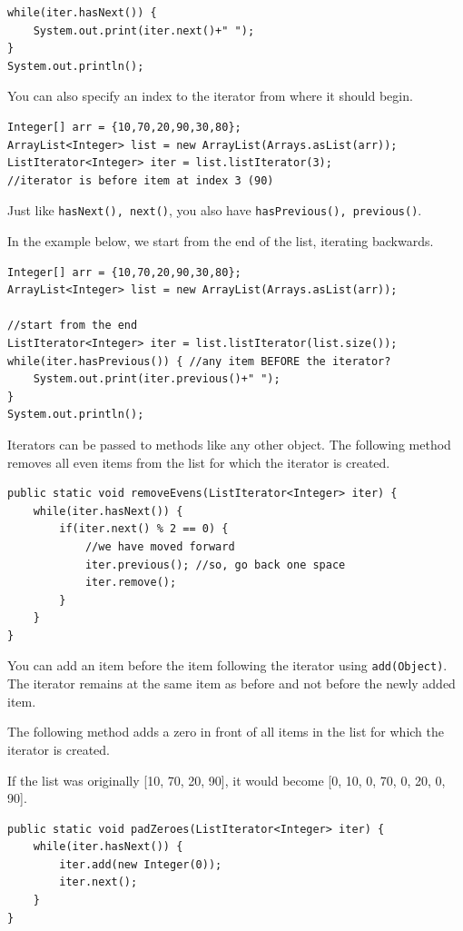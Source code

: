 \begin{lstlisting}
while(iter.hasNext()) {
	System.out.print(iter.next()+" ");
}
System.out.println();
\end{lstlisting}

You can also specify an index to the iterator from where it should begin.

\begin{lstlisting}
Integer[] arr = {10,70,20,90,30,80};
ArrayList<Integer> list = new ArrayList(Arrays.asList(arr));
ListIterator<Integer> iter = list.listIterator(3); 
//iterator is before item at index 3 (90)
\end{lstlisting}

Just like \texttt{hasNext(), next()}, you also have \texttt{hasPrevious(), previous()}.

In the example below, we start from the end of the list, iterating backwards.

\begin{lstlisting}
Integer[] arr = {10,70,20,90,30,80};
ArrayList<Integer> list = new ArrayList(Arrays.asList(arr));

//start from the end
ListIterator<Integer> iter = list.listIterator(list.size());
while(iter.hasPrevious()) { //any item BEFORE the iterator?
	System.out.print(iter.previous()+" ");
}
System.out.println();
\end{lstlisting}

Iterators can be passed to methods like any other object.
The following method removes all even items from the list for which the iterator is created.

\begin{lstlisting}
public static void removeEvens(ListIterator<Integer> iter) {
	while(iter.hasNext()) {
		if(iter.next() % 2 == 0) {
			//we have moved forward
			iter.previous(); //so, go back one space
			iter.remove(); 
		}
	}
}
\end{lstlisting}

You can add an item before the item following the iterator using \texttt{add(Object)}. The iterator remains at the same item as before and not before the newly added item.

The following method adds a zero in front of all items in the list for which the iterator is created. 

If the list was originally [10, 70, 20, 90], it would become [0, 10, 0, 70, 0, 20, 0, 90].

\begin{lstlisting}
public static void padZeroes(ListIterator<Integer> iter) {
	while(iter.hasNext()) {
		iter.add(new Integer(0)); 
		iter.next();
	}
}
\end{lstlisting}

